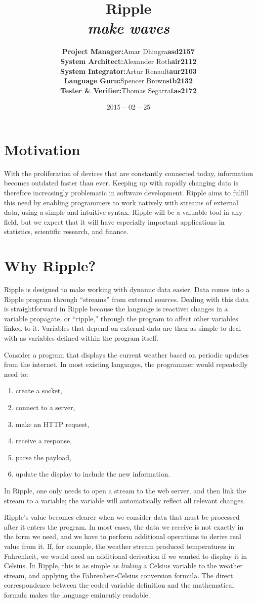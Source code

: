 \documentclass{article}
\title{Ripple \\ {\large\it make waves}}
\author{\begin{tabular}{rcl}
\textbf{Project Manager:}    &   Amar Dhingra   &   \textbf{asd2157} \\
\textbf{System Architect:}   &   Alexander Roth &   \textbf{air2112} \\
\textbf{System Integrator:}  &   Artur Renault  &   \textbf{aur2103} \\
\textbf{Language Guru:}      &   Spencer Brown  &   \textbf{stb2132} \\
\textbf{Tester \& Verifier:} &   Thomas Segarra &   \textbf{tas2172}
\end{tabular}}
\date{2015 -- 02 -- 25}
\begin{document}
\maketitle

\section*{Motivation}
With the proliferation of devices that are constantly connected today,
information becomes outdated faster than ever. Keeping up with rapidly changing
data is therefore increasingly problematic in software development. Ripple aims
to fulfill this need by enabling programmers to work natively with streams of
external data, using a simple and intuitive syntax. Ripple will be a valuable
tool in any field, but we expect that it will have especially important
applications in statistics, scientific research, and finance.

\section*{Why Ripple?}
Ripple is designed to make working with dynamic data easier. Data comes into
a Ripple program through ``streams'' from external sources. Dealing with this data is straightforward in Ripple because the language is reactive: changes in a variable propagate, or ``ripple,'' through the program to affect other variables linked to it.
Variables that depend on external data are then as simple to deal with as
variables defined within the program itself.

Consider a program that displays the current weather based on periodic
updates from the internet. In most existing languages, the programmer would
repeatedly need to:
\begin{enumerate}
\itemsep0em
\item create a socket,
\item connect to a server,
\item make an HTTP request,
\item receive a response,
\item parse the payload,
\item update the display to include the new information.
\end{enumerate}
In Ripple, one only needs to open a stream to the web server, and then link the
stream to a variable; the variable will automatically reflect all relevant
changes.
    
Ripple's value becomes clearer when we consider data that must be processed
after it enters the program. In most cases, the data we receive is not exactly
in the form we need, and we have to perform additional operations to derive real
value from it. If, for example, the weather stream produced temperatures in
Fahrenheit, we would need an additional derivation if we wanted to display it in
Celsius. In Ripple, this is as simple as \emph{linking} a Celsius variable to
the weather stream, and applying the Fahrenheit-Celsius conversion formula. The
direct correspondence between the coded variable definition and the mathematical
formula makes the language eminently readable.
\end{document}
